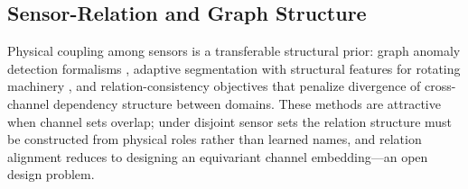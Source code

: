 \subsection{Sensor-Relation and Graph Structure}
Physical coupling among sensors is a transferable structural prior: graph anomaly detection formalisms \cite{2302_00058,2307_03759}, adaptive segmentation with structural features for rotating machinery \cite{2504_20756}, and relation-consistency objectives that penalize divergence of cross-channel dependency structure between domains. These methods are attractive when channel sets overlap; under disjoint sensor sets the relation structure must be constructed from physical roles rather than learned names, and relation alignment reduces to designing an equivariant channel embedding---an open design problem.
